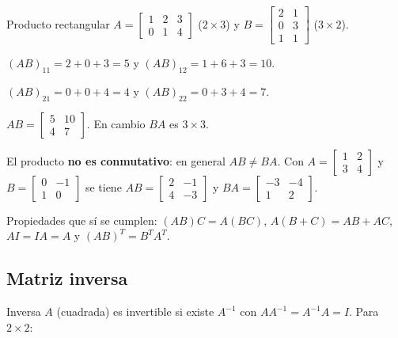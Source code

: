 \begin{tmejemplo}{Producto rectangular}
$A=\begin{bmatrix}1&2&3\\0&1&4\end{bmatrix}$ ($2\times3$) y $B=\begin{bmatrix}2&1\\0&3\\1&1\end{bmatrix}$ ($3\times2$).
\begin{tmpasos}
\item $(AB)_{11}=2+0+3=5$ y $(AB)_{12}=1+6+3=10$.
\item $(AB)_{21}=0+0+4=4$ y $(AB)_{22}=0+3+4=7$.
\item $AB=\begin{bmatrix}5&10\\4&7\end{bmatrix}$. En cambio $BA$ es $3\times3$.
\end{tmpasos}
\end{tmejemplo}

\begin{tmcuidado}El producto \textbf{no es conmutativo}: en general $AB\neq BA$. Con $A=\begin{bmatrix}1&2\\3&4\end{bmatrix}$ y $B=\begin{bmatrix}0&-1\\1&0\end{bmatrix}$ se tiene $AB=\begin{bmatrix}2&-1\\4&-3\end{bmatrix}$ y $BA=\begin{bmatrix}-3&-4\\1&2\end{bmatrix}$.\end{tmcuidado}

\begin{tmtip}Propiedades que s\'i se cumplen: $(AB)C=A(BC)$, $A(B+C)=AB+AC$, $AI=IA=A$ y $(AB)^T=B^TA^T$.\end{tmtip}

\subsection{Matriz inversa}
\begin{tmdef}{Inversa}
$A$ (cuadrada) es invertible si existe $A^{-1}$ con $AA^{-1}=A^{-1}A=I$. Para $2\times2$:
\end{tmdef}

